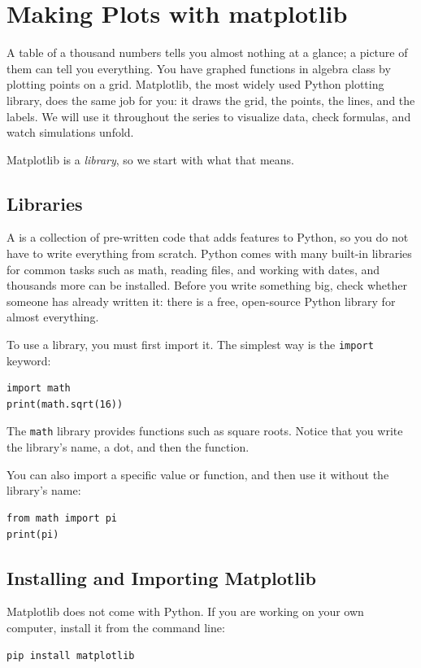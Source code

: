 \chapter{Making Plots with matplotlib}

A table of a thousand numbers tells you almost nothing at a glance; a
picture of them can tell you everything. You have graphed functions in
algebra class by plotting points on a grid. Matplotlib, the most widely used
Python plotting library, does the same job for you: it draws the grid, the
points, the lines, and the labels. We will use it throughout the series to
visualize data, check formulas, and watch simulations unfold.

Matplotlib is a \emph{library}, so we start with what that means.

\section{Libraries}
A  is a collection of pre-written code that adds features to
Python, so you do not have to write everything from scratch. Python comes with
many built-in libraries for common tasks such as math, reading files, and
working with dates, and thousands more can be installed. Before you write
something big, check whether someone has already written it: there is a free,
open-source Python library for almost everything.

To use a library, you must first import it. The simplest way is the
\texttt{import} keyword:

\begin{verbatim}
import math
print(math.sqrt(16))
\end{verbatim}

The \texttt{math} library provides functions such as square roots.
Notice that you write the library's name, a dot, and then the function.

You can also import a specific value or function, and then use it without the
library's name:

\begin{verbatim}
from math import pi
print(pi)
\end{verbatim}

\section{Installing and Importing Matplotlib}
Matplotlib does not come with Python. If you are working on your own computer,
install it from the command line:
\begin{verbatim}
pip install matplotlib
\end{verbatim}

